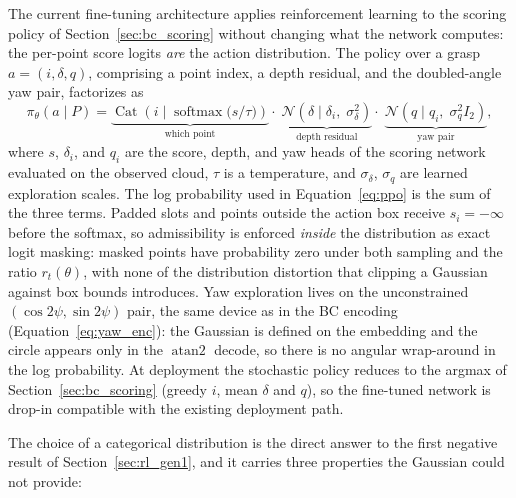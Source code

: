 The current fine-tuning architecture applies reinforcement learning to the
scoring policy of Section~\ref{sec:bc_scoring} without changing what the
network computes: the per-point score logits \emph{are} the action
distribution. The policy over a grasp $a = (i, \delta, q)$, comprising a
point index, a depth residual, and the doubled-angle yaw pair, factorizes as
\begin{equation}
  \pi_\theta(a \mid P) =
  \underbrace{\operatorname{Cat}\!\left( i \;\Big|\;
      \operatorname{softmax}\!\big( s / \tau \big) \right)}_{\text{which point}}
  \cdot\;
  \underbrace{\mathcal{N}\!\left( \delta \mid \delta_i,\; \sigma_\delta^2 \right)}_{\text{depth residual}}
  \cdot\;
  \underbrace{\mathcal{N}\!\left( q \mid q_i,\; \sigma_q^2 I_2 \right)}_{\text{yaw pair}},
  \label{eq:cat_policy}
\end{equation}
where $s$, $\delta_i$, and $q_i$ are the score, depth, and yaw heads of the
scoring network evaluated on the observed cloud, $\tau$ is a temperature,
and $\sigma_\delta$, $\sigma_q$ are learned exploration scales. The log
probability used in Equation~\eqref{eq:ppo} is the sum of the three terms.
Padded slots and points outside the action box receive $s_i = -\infty$
before the softmax, so admissibility is enforced \emph{inside} the
distribution as exact logit masking: masked points have probability zero
under both sampling and the ratio $r_t(\theta)$, with none of the
distribution distortion that clipping a Gaussian against box bounds
introduces. Yaw exploration lives on the unconstrained
$(\cos 2\psi, \sin 2\psi)$ pair, the same device as in the BC encoding
(Equation~\eqref{eq:yaw_enc}): the Gaussian is defined on the embedding and
the circle appears only in the $\operatorname{atan2}$ decode, so there is no
angular wrap-around in the log probability. At deployment the stochastic
policy reduces to the argmax of Section~\ref{sec:bc_scoring} (greedy
$i$, mean $\delta$ and $q$), so the fine-tuned network is drop-in
compatible with the existing deployment path.

The choice of a categorical distribution is the direct answer to the first
negative result of Section~\ref{sec:rl_gen1}, and it carries three
properties the Gaussian could not provide:


